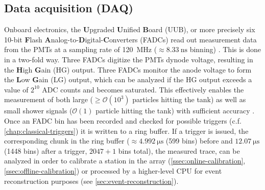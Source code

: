 \subsection{Data acquisition (DAQ)}
\label{ssec:sd-daq}

Onboard electronics, the \textbf{U}pgraded \textbf{U}nified \textbf{B}oard (UUB), or more precisely six 10-bit \textbf{F}lash 
\textbf{A}nalog-to-\textbf{D}igital-\textbf{C}onverters (FADCs) read out measurement data from the PMTs at a sampling rate of \SI{120}{\mega\hertz} 
($\approx\SI{8.33}{\nano\second}$ binning) \cite{verzi2013energy}. This is done in a two-fold way. Three FADCs digitize the PMTs dynode voltage, resulting in the
\textbf{H}igh \textbf{G}ain (HG) output. Three FADCs monitor the anode voltage to form the \textbf{L}ow \textbf{G}ain (LG) output, which can be analyzed if the 
HG output exceeds a value of $2^{10}$ ADC counts and becomes saturated. This effectively enables the measurement of both large ($\geq\mathcal{O}(10^3)$ particles
hitting the tank) as well as small shower signals ($\mathcal{O}(1)$ particle hitting the tank) with sufficient accuracy \cite{SDReconstruction}. Once an FADC bin 
has been recorded and checked for possible triggers (c.f. \autoref{chap:classical-triggers}) it is written to a ring buffer. If a trigger is issued, the corresponding 
chunk in the ring buffer ($\approx\SI{4.992}{\micro\second}$ (599 bins) before and $\SI{12.07}{\micro\second}$ (1448 bins) after a trigger, $2047 + 1$ bins total),
the measured trace, can be analyzed in order to calibrate a station in the array (\autoref{ssec:online-calibration}, \autoref{ssec:offline-calibration}) or 
processed by a higher-level CPU for event reconstruction purposes (see \autoref{sec:event-reconstruction}).

